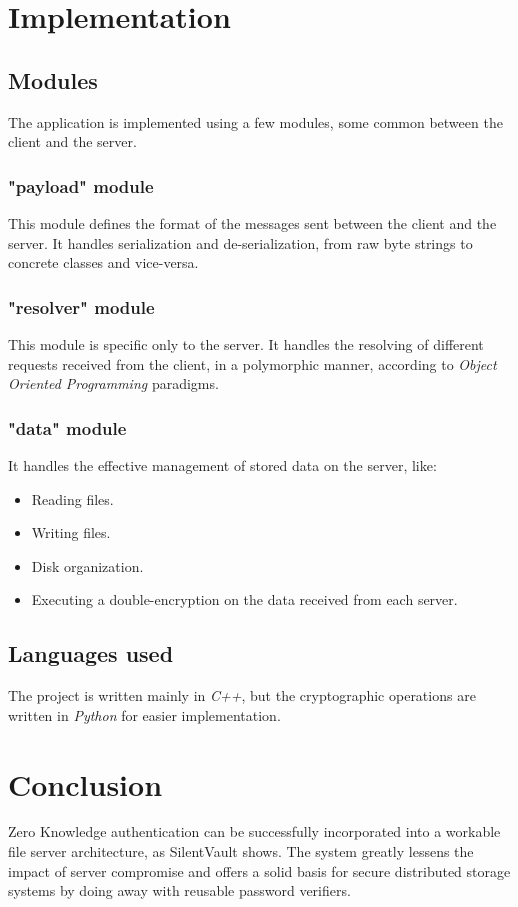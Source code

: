 \documentclass[conference]{IEEEtran}
\begin{document}
\section{Implementation}
\subsection{Modules}
The application is implemented using a few modules, some common between the client and the server.
\subsubsection{"payload" module}
This module defines the format of the messages sent between the client and the server. It handles serialization and de-serialization, from raw byte strings to concrete classes and vice-versa.
\subsubsection{"resolver" module}
This module is specific only to the server. It handles the resolving of different requests received from the client, in a polymorphic manner, according to \textit{Object Oriented Programming} paradigms.
\subsubsection{"data" module}
It handles the effective management of stored data on the server, like:
\begin{itemize}
    \item Reading files.
    \item Writing files.
    \item Disk organization.
    \item Executing a double-encryption on the data received from each server.
\end{itemize}
\subsection{Languages used}
The project is written mainly in \textit{C++}, but the cryptographic operations are written in \textit{Python} for easier implementation.

\section{Conclusion}

Zero Knowledge authentication can be successfully incorporated into a workable file server architecture, as SilentVault shows.
The system greatly lessens the impact of server compromise and offers a solid basis for secure distributed storage systems by doing away with reusable password verifiers.
\end{document}
